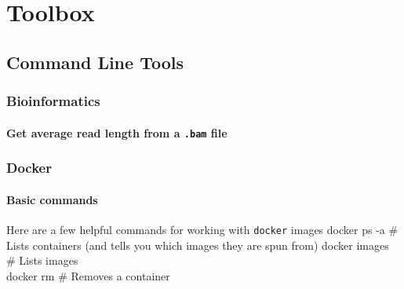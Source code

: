 \documentclass[openany]{book}
\newenvironment{Shaded}{\begin{snugshade}}{\end{snugshade}}
\newcommand{\ExtensionTok}[1]{#1}
\newcommand{\FunctionTok}[1]{\textcolor[rgb]{0.00,0.00,0.00}{#1}}
\newcommand{\KeywordTok}[1]{\textcolor[rgb]{0.13,0.29,0.53}{\textbf{#1}}}
\newcommand{\NormalTok}[1]{#1}
\newcommand{\StringTok}[1]{\textcolor[rgb]{0.31,0.60,0.02}{#1}}
\begin{document}
\hypertarget{toolbox}{%
\chapter{Toolbox}\label{toolbox}}

\hypertarget{command-line-tools}{%
\section{Command Line Tools}\label{command-line-tools}}

\hypertarget{bioinformatics}{%
\subsection{Bioinformatics}\label{bioinformatics}}

\hypertarget{get-average-read-length-from-a-.bam-file}{%
\subsubsection{\texorpdfstring{Get average read length from a \texttt{.bam} file}{Get average read length from a .bam file}}\label{get-average-read-length-from-a-.bam-file}}

\begin{Shaded}
\end{Shaded}

\hypertarget{docker}{%
\subsection{Docker}\label{docker}}

\hypertarget{basic-commands}{%
\subsubsection{Basic commands}\label{basic-commands}}

Here are a few helpful commands for working with \texttt{docker} images
docker ps -a \# Lists containers (and tells you which images they are spun from)
docker images \# Lists images\\
docker rm \# Removes a container
\end{document}
